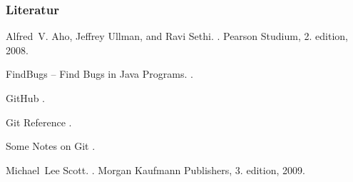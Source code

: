 \documentclass[ucs,9pt]{beamer}
\begin{document}
\begin{frame}
  \frametitle{Literatur}
    
  \begin{thebibliography}{10}
    
  \beamertemplatebookbibitems

  
    Alfred~V. Aho, Jeffrey Ullman, and Ravi Sethi.
    .
    \newblock Pearson Studium, 2. edition, 2008.


    {F}ind{B}ugs -- {F}ind {B}ugs in {J}ava {P}rograms.
    .
  
    {G}it{H}ub
    .

       {G}it {R}eference
    .

       {S}ome {N}otes on {G}it
    .

      Michael~Lee Scott.
      .
      \newblock Morgan Kaufmann Publishers, 3. edition, 2009.
    
  \end{thebibliography}
\end{frame}
\end{document}
